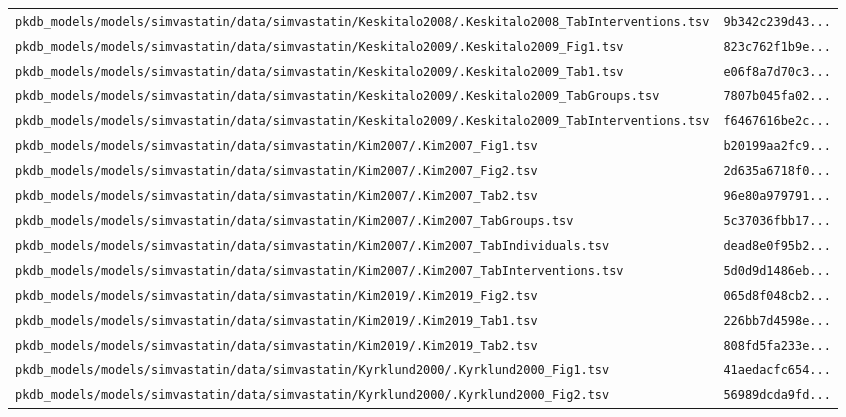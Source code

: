 \documentclass{article}
\begin{document}
\begin{longtable}{ll}
\texttt{pkdb\_models/models/simvastatin/data/simvastatin/Keskitalo2008/.Keskitalo2008\_TabInterventions.tsv} & \texttt{9b342c239d43...} \\
\texttt{pkdb\_models/models/simvastatin/data/simvastatin/Keskitalo2009/.Keskitalo2009\_Fig1.tsv} & \texttt{823c762f1b9e...} \\
\texttt{pkdb\_models/models/simvastatin/data/simvastatin/Keskitalo2009/.Keskitalo2009\_Tab1.tsv} & \texttt{e06f8a7d70c3...} \\
\texttt{pkdb\_models/models/simvastatin/data/simvastatin/Keskitalo2009/.Keskitalo2009\_TabGroups.tsv} & \texttt{7807b045fa02...} \\
\texttt{pkdb\_models/models/simvastatin/data/simvastatin/Keskitalo2009/.Keskitalo2009\_TabInterventions.tsv} & \texttt{f6467616be2c...} \\
\texttt{pkdb\_models/models/simvastatin/data/simvastatin/Kim2007/.Kim2007\_Fig1.tsv} & \texttt{b20199aa2fc9...} \\
\texttt{pkdb\_models/models/simvastatin/data/simvastatin/Kim2007/.Kim2007\_Fig2.tsv} & \texttt{2d635a6718f0...} \\
\texttt{pkdb\_models/models/simvastatin/data/simvastatin/Kim2007/.Kim2007\_Tab2.tsv} & \texttt{96e80a979791...} \\
\texttt{pkdb\_models/models/simvastatin/data/simvastatin/Kim2007/.Kim2007\_TabGroups.tsv} & \texttt{5c37036fbb17...} \\
\texttt{pkdb\_models/models/simvastatin/data/simvastatin/Kim2007/.Kim2007\_TabIndividuals.tsv} & \texttt{dead8e0f95b2...} \\
\texttt{pkdb\_models/models/simvastatin/data/simvastatin/Kim2007/.Kim2007\_TabInterventions.tsv} & \texttt{5d0d9d1486eb...} \\
\texttt{pkdb\_models/models/simvastatin/data/simvastatin/Kim2019/.Kim2019\_Fig2.tsv} & \texttt{065d8f048cb2...} \\
\texttt{pkdb\_models/models/simvastatin/data/simvastatin/Kim2019/.Kim2019\_Tab1.tsv} & \texttt{226bb7d4598e...} \\
\texttt{pkdb\_models/models/simvastatin/data/simvastatin/Kim2019/.Kim2019\_Tab2.tsv} & \texttt{808fd5fa233e...} \\
\texttt{pkdb\_models/models/simvastatin/data/simvastatin/Kyrklund2000/.Kyrklund2000\_Fig1.tsv} & \texttt{41aedacfc654...} \\
\texttt{pkdb\_models/models/simvastatin/data/simvastatin/Kyrklund2000/.Kyrklund2000\_Fig2.tsv} & \texttt{56989dcda9fd...} \\

\end{longtable}
\end{document}
